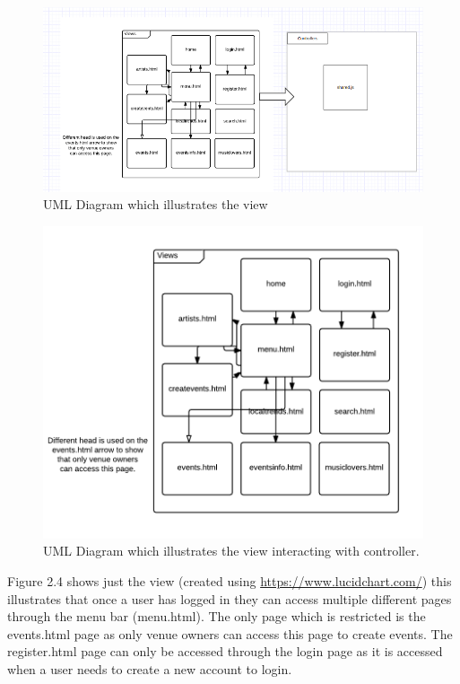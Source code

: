 \begin{center}
\begin{figure}[H]
\includegraphics[width=\textwidth,height=\textheight,keepaspectratio]{images/systemdesign}
\caption{UML Diagram which illustrates the view}
\end{figure}
\begin{figure}[H]
\includegraphics[width=\textwidth,height=\textheight,keepaspectratio]{images/va}
\caption{UML Diagram which illustrates the view interacting with controller.}
\end{figure}
\end{center}
Figure 2.4 shows just the view (created using \url{https://www.lucidchart.com/}) this illustrates that once a user has logged in they can access multiple different pages through the menu bar (menu.html). The only page which is restricted is the events.html page as only venue owners can access this page to create events. The register.html page can only be accessed through the login page as it is accessed when a user needs to create a new account to login.

